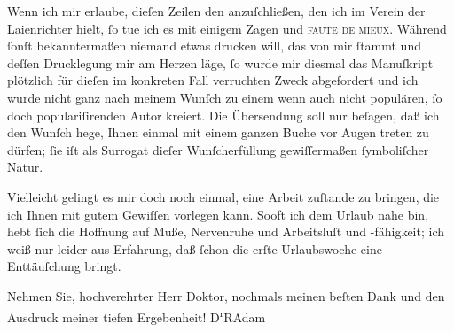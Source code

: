 \pstart
           Wenn ich mir erlaube, dieſen Zeilen den \label{K_L02514-1v}\label{K_L02514-1} anzuſchließen, den ich im Verein der Laienrichter hielt,{ }ſo tue ich es mit einigem Zagen und \textsc{faute de mieux}. Während{ }ſonſt bekanntermaßen niemand etwas
               drucken will, das von mir{ }ſtammt und deſſen Drucklegung mir am Herzen läge,{ }ſo wurde
               mir diesmal das Manuſkript plötzlich für dieſen im konkreten Fall verruchten Zweck
               abgefordert und ich wurde nicht ganz nach meinem Wunſch zu einem wenn auch nicht
               populären,{ }ſo doch populariſirenden Autor kreiert. Die Übersendung soll nur beſagen,
               daß ich den Wunſch hege, Ihnen einmal mit einem ganzen Buche {\pb}vor Augen treten zu dürfen;{ }ſie iſt als
               Surrogat dieſer Wunſcherfüllung gewiſſermaßen{ }ſymboliſcher Natur.\pend
           
\pstart
           Vielleicht gelingt es mir doch noch einmal, eine Arbeit zuſtande zu bringen, die ich
               Ihnen mit gutem Gewiſſen vorlegen kann. Sooft ich dem Urlaub nahe bin, hebt{ }ſich die
               Hoffnung auf Muße, Nervenruhe und Arbeitsluſt und -fähigkeit; ich weiß nur leider aus
               Erfahrung, daß{ }ſchon die erſte Urlaubswoche eine Enttäuſchung bringt.\pend
           
\pstart
           Nehmen Sie, hochverehrter Herr Doktor, nochmals meinen beſten Dank und den Ausdruck
               meiner tiefen Ergebenheit!\pend
           \pstart \spacefill\mbox{D\textsuperscript{r}RAdam}\pend{}\endnumbering{}  \newcommand{\dateiname}{L02514}\newcommand{\titel}{Robert Adam an Arthur Schnitzler, 22. 7. 1929}\newcommand{\editorInnen}{Martin Anton Müller und Gerd-Hermann Susen}
